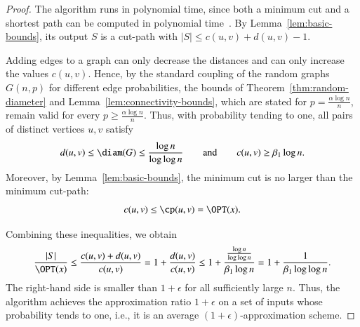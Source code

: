 \begin{proof}
The algorithm runs in polynomial time, since both a minimum cut and a shortest path can be computed in polynomial time~\cite{Cormen2022}.
By Lemma~\ref{lem:basic-bounds}, its output $S$ is a cut-path with $|S| \leq c(u,v) + d(u,v) - 1$.

Adding edges to a graph can only decrease the distances and can only increase the values $c(u,v)$.
Hence, by the standard coupling of the random graphs $G(n,p)$ for different edge probabilities, the bounds of Theorem~\ref{thm:random-diameter} and Lemma~\ref{lem:connectivity-bounds}, which are stated for $p = \frac{\alpha \log n}{n}$, remain valid for every $p \geq \frac{\alpha \log n}{n}$.
Thus, with probability tending to one, all pairs of distinct vertices $u,v$ satisfy
\[
d(u,v) \leq \diam(G) \leq \frac{\log n}{\log \log n}
\qquad\text{and}\qquad
c(u,v) \geq \beta_1 \log n.
\]
Moreover, by Lemma~\ref{lem:basic-bounds}, the minimum cut is no larger than the minimum cut-path:
\[
c(u,v) \leq \cp(u,v) = \OPT(x).
\]

Combining these inequalities, we obtain
\[
\frac{|S|}{\OPT(x)} \leq \frac{c(u,v)+d(u,v)}{c(u,v)} = 1 + \frac{d(u,v)}{c(u,v)} \leq
1+\frac{\frac{\log n}{\log \log n}}{\beta_1 \log n} = 1 + \frac{1}{\beta_1 \log \log n}.
\]
The right-hand side is smaller than $1+\epsilon$ for all sufficiently large $n$.
Thus, the algorithm achieves the approximation ratio $1+\epsilon$ on a set of inputs whose probability tends to one, i.e., it is an average $(1+\epsilon)$-approximation scheme.
\end{proof}


